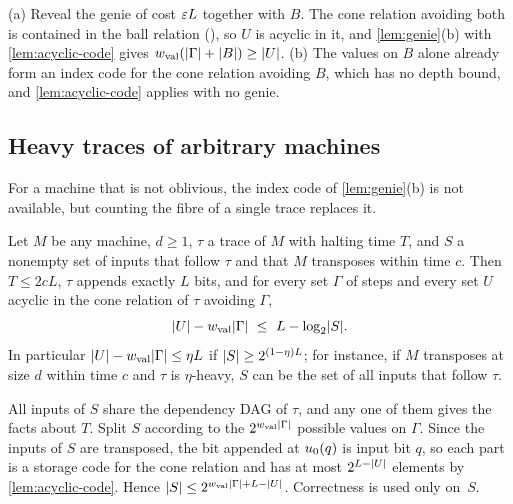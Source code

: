 \begin{outline}
(a) Reveal the genie of cost $\varepsilon L$ together with $B$. The cone relation avoiding both is contained in the ball relation
(), so $U$ is acyclic in it, and \cref{lem:genie}(b) with \cref{lem:acyclic-code} gives
$w_{\mathrm{val}}(\lvert \Gamma \rvert+\lvert B \rvert)\ge\lvert U \rvert$. (b) The values on $B$ alone already form an index code for the cone relation avoiding $B$,
which has no depth bound, and \cref{lem:acyclic-code} applies with no genie.
\end{outline}

\subsection{Heavy traces of arbitrary machines}

For a machine that is not oblivious, the index code of \cref{lem:genie}(b) is not available, but counting the fibre of a single
trace replaces it.

\begin{lemma}\label{lem:frozen}
Let $M$ be any machine, $d\ge1$, $\tau$ a trace of $M$ with halting time $T$, and $S$ a nonempty set of inputs that follow $\tau$ and
that $M$ transposes within time $c$. Then $T\le2cL$, $\tau$ appends exactly $L$ bits, and for every set $\Gamma$ of steps and every set
$U$ acyclic in the cone relation of $\tau$ avoiding $\Gamma$,
\[
  \lvert U \rvert-w_{\mathrm{val}}\lvert \Gamma \rvert\ \le\ L-\log_2\lvert S \rvert .
\]
In particular $\lvert U \rvert-w_{\mathrm{val}}\lvert \Gamma \rvert\le\eta L$ if $\lvert S \rvert\ge2^{(1-\eta)L}$; for instance, if $M$ transposes at size $d$ within time
$c$ and $\tau$ is $\eta$-heavy, $S$ can be the set of all inputs that follow $\tau$.
\end{lemma}

\begin{outline}
All inputs of $S$ share the dependency DAG of $\tau$, and any one of them gives the facts about $T$. Split $S$ according to the
$2^{w_{\mathrm{val}}\lvert \Gamma \rvert}$ possible values on $\Gamma$. Since the inputs of $S$ are transposed, the bit appended at $u_0(q)$ is input
bit $q$, so each part is a storage code for the cone relation and has at most $2^{L-\lvert U \rvert}$ elements by \cref{lem:acyclic-code}.
Hence $\lvert S \rvert\le2^{w_{\mathrm{val}}\lvert \Gamma \rvert+L-\lvert U \rvert}$. Correctness is used only on~$S$.
\end{outline}

